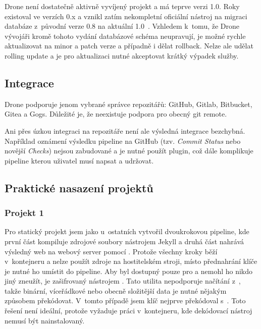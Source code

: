         Drone není dostatečně aktivně vyvíjený projekt a má teprve verzi 1.0. Roky existoval ve verzích 0.x a vznikl zatím nekompletní oficiální nástroj na migraci databáze z~původní verze 0.8 na aktuální 1.0~\cite{drone-mig}. Vzhledem k~tomu, že Drone vývojáři kromě tohoto vydání databázové schéma neupravují, je možné rychle aktualizovat na minor a patch verze a případně i dělat rollback. Nelze ale udělat rolling update a je pro aktualizaci nutné akceptovat krátký výpadek služby.

    \subsection{Integrace}
        Drone podporuje jenom vybrané správce repozitářů: GitHub, Gitlab, Bitbucket, Gitea a Gogs. Důležité je, že neexistuje podpora pro obecný git remote.

        Ani přes úzkou integraci na repozitáře není ale výsledná integrace bezchybná. Například oznámení výsledku pipeline na GitHub (tzv. \textit{Commit Status} nebo novější \textit{Checks}) nejsou zabudované a je nutné použít plugin, což dále komplikuje pipeline kterou uživatel musí napsat a udržovat.


    \subsection{Praktické nasazení projektů}
        \subsubsection{Projekt 1}
            Pro statický projekt jsem jako u~ostatních \CI vytvořil dvoukrokovou pipeline, kde první část kompiluje zdrojové soubory nástrojem Jekyll a druhá část nahrává výsledný web na webový server pomocí . Protože všechny kroky běží v~kontejneru a nelze použít zdroje na hostitelském stroji, místo přednahrání  klíče je nutné ho umístit do pipeline. Aby byl dostupný pouze pro \CI a nemohl ho nikdo jiný zneužít, je zašifrovaný  nástrojem . Tato utilita nepodporuje načítání z~, takže binární, víceřádkové nebo obecně složitější data je nutné nějakým způsobem překódovat. V~tomto případě jsem klíč nejprve překódoval s~. Toto řešení není ideální, protože vyžaduje práci v~kontejneru, kde dekódovací nástroj nemusí být nainstalovaný.

